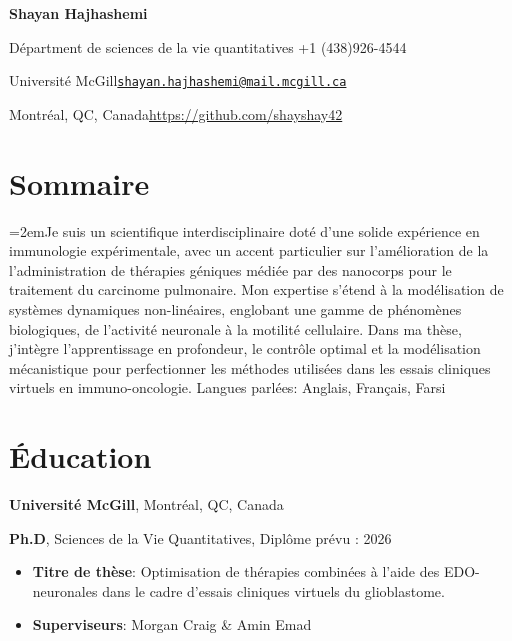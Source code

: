 \documentclass{article}
\newcommand{\cvsection}[1]{\section*{\rmfamily#1}}
\begin{document}
\begin{center}
    \Huge{
    \rmfamily
    \textbf{Shayan Hajhashemi}}
\end{center}
\vspace{20pt}


\setlength{\parskip}{1pt}
\renewcommand{\arraystretch}{1.25}


\noindent Départment de sciences de la vie quantitatives \hfill +1 (438)926-4544

\noindent Université McGill\hfill \href{mailto:shayan.hajhashemi@mail.mcgill.ca}{\texttt{shayan.hajhashemi@mail.mcgill.ca}}

\noindent Montréal, QC, Canada\hfill \url{https://github.com/shayshay42}


\setlength{\parskip}{3pt}




\cvsection{Sommaire}
\indent

\hangindent=2emJe suis un scientifique interdisciplinaire doté d'une solide expérience en immunologie expérimentale, avec un accent particulier sur l'amélioration de la l'administration de thérapies géniques médiée par des nanocorps pour le traitement du carcinome pulmonaire. Mon expertise s'étend à la modélisation de systèmes dynamiques non-linéaires, englobant une gamme de phénomènes biologiques, de l'activité neuronale à la motilité cellulaire. Dans ma thèse, j'intègre l'apprentissage en profondeur, le contrôle optimal et la modélisation mécanistique pour perfectionner les méthodes utilisées dans les essais cliniques virtuels en immuno-oncologie.
Langues parlées: Anglais, Français, Farsi

\cvsection{Éducation}
\indent

\textbf{Université McGill}, Montréal, QC, Canada

\hspace{1em} \textbf{Ph.D}, Sciences de la Vie Quantitatives, \hfill Diplôme prévu : 2026
\begin{itemize}[leftmargin=4em, itemsep=0pt]
    \item[] \textbf{Titre de thèse}: Optimisation de thérapies combinées à l'aide des EDO-neuronales dans le cadre d'essais cliniques virtuels du glioblastome.
    \item[] \textbf{Superviseurs}: Morgan Craig \& Amin Emad
\end{itemize}
\vspace{3pt}
\end{document}

